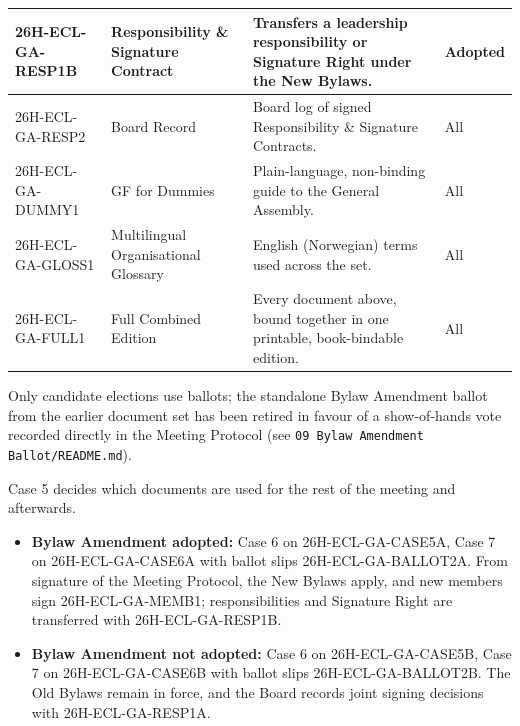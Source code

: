 \documentclass{../../../Common/Latex/Templates/rapport}
\begin{document}
\begin{longtable}{|L{3.2cm}|L{3.6cm}|L{5.3cm}|L{1.9cm}|}
  \hline
  26H-ECL-GA-RESP1B    & Responsibility \& Signature Contract       & Transfers a leadership responsibility or Signature Right under the New Bylaws.                                               & Adopted       \\
  \hline
  26H-ECL-GA-RESP2     & Board Record                               & Board log of signed Responsibility \& Signature Contracts.                                                                   & All           \\
  \hline
  26H-ECL-GA-DUMMY1    & GF for Dummies                             & Plain-language, non-binding guide to the General Assembly.                                                                   & All           \\
  \hline
  26H-ECL-GA-GLOSS1    & Multilingual Organisational Glossary       & English (Norwegian) terms used across the set.                                                                               & All           \\
  \hline
  26H-ECL-GA-FULL1     & Full Combined Edition                      & Every document above, bound together in one printable, book-bindable edition.                                                & All           \\
  \hline
\end{longtable}
\endgroup

Only candidate elections use ballots; the standalone Bylaw Amendment ballot from the earlier document set has been retired in favour of a show-of-hands vote recorded directly in the Meeting Protocol (see \texttt{09 Bylaw Amendment Ballot/README.md}).

Case 5 decides which documents are used for the rest of the meeting and afterwards.
\begin{itemize}
  \item \textbf{Bylaw Amendment adopted:} Case 6 on 26H-ECL-GA-CASE5A, Case 7 on 26H-ECL-GA-CASE6A with ballot slips 26H-ECL-GA-BALLOT2A. From signature of the Meeting Protocol, the New Bylaws apply, and new members sign 26H-ECL-GA-MEMB1; responsibilities and Signature Right are transferred with 26H-ECL-GA-RESP1B.
  \item \textbf{Bylaw Amendment not adopted:} Case 6 on 26H-ECL-GA-CASE5B, Case 7 on 26H-ECL-GA-CASE6B with ballot slips 26H-ECL-GA-BALLOT2B. The Old Bylaws remain in force, and the Board records joint signing decisions with 26H-ECL-GA-RESP1A.
\end{itemize}
\end{document}
